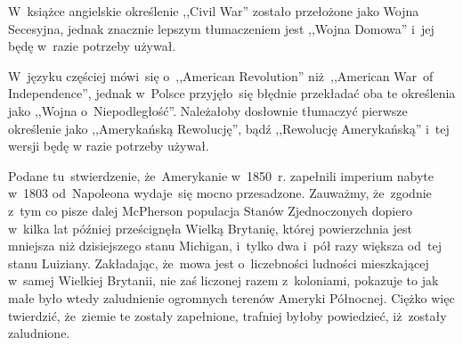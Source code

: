 \documentclass[a4paper,11pt]{article}
\begin{document}
\vspace{\spaceTwo}





\newpage
{} %

\vspace{\spaceTwo} \vspace{\spaceThree}






\start W~książce angielskie określenie ,,Civil War'' zostało
przełożone jako Wojna Secesyjna, jednak znacznie lepszym tłumaczeniem
jest ,,Wojna Domowa'' i~jej będę w~razie potrzeby używał.

\vspace{\spaceFour}


\start W~języku częściej mówi~się o~,,American Revolution''
niż~,,American War~of Independence'', jednak w~Polsce przyjęło~się
błędnie przekładać oba te określenia jako ,,Wojna o~Niepodległość''.
Należałoby dosłownie tłumaczyć pierwsze określenie jako ,,Amerykańską
Rewolucję'', bądź ,,Rewolucję Amerykańską'' i~tej wersji będę w razie
potrzeby używał.

\vspace{\spaceFour}


\start {} Podane tu~stwierdzenie, że~Amerykanie w~1850~r.
zapełnili imperium nabyte w~1803 od~Napoleona wydaje~się mocno
przesadzone. Zauważmy, że~zgodnie z~tym co pisze dalej McPherson
populacja Stanów Zjednoczonych dopiero w~kilka lat później
prześcignęła Wielką Brytanię, której powierzchnia jest mniejsza niż
dzisiejszego stanu Michigan, i~tylko dwa i~pół razy większa od~tej
stanu Luiziany. Zakładając, że~mowa jest o~liczebności ludności
mieszkającej w~samej Wielkiej Brytanii, nie zaś liczonej razem
z~koloniami, pokazuje to jak małe było wtedy zaludnienie ogromnych
terenów Ameryki Północnej. Ciężko więc twierdzić, że~ziemie te zostały
zapełnione, trafniej byłoby powiedzieć, iż~zostały zaludnione.

\end{document}
